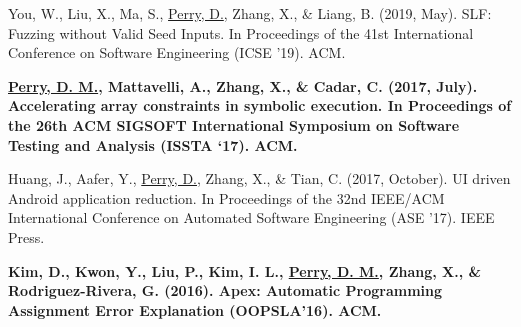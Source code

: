 \documentclass[]{deedy-resume-openfont}
\begin{document}
\vspace{.05in}

You, W., Liu, X., Ma, S., \underline{Perry, D.}, Zhang, X., \& Liang, B. (2019,
May). SLF: Fuzzing without Valid Seed Inputs. In
Proceedings of the 41st International Conference on Software Engineering (ICSE '19). ACM.

\vspace{.05in}

{\fontsize{10pt}{12pt}\selectfont\bfseries \underline{Perry, D. M.}, Mattavelli, A., Zhang, X., \& Cadar, C. (2017, July). Accelerating array constraints in symbolic execution. In Proceedings of the 26th ACM SIGSOFT International Symposium on Software Testing and Analysis (ISSTA `17). ACM. }
\vspace{.05in}

Huang, J., Aafer, Y., \underline{Perry, D.}, Zhang, X., \& Tian, C. (2017, October). UI driven Android application reduction. In Proceedings of the 32nd IEEE/ACM International Conference on Automated Software Engineering (ASE '17). IEEE Press.

\vspace{.05in}
{\fontsize{10pt}{12pt}\selectfont\bfseries Kim, D., Kwon, Y., Liu, P., Kim, I. L., \underline{Perry, D. M.}, Zhang, X., \& Rodriguez-Rivera, G. (2016). Apex: Automatic Programming Assignment Error Explanation (OOPSLA’16). ACM.}

%
\sectionsep

\end{document}
